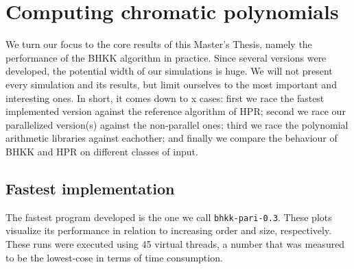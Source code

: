 \documentclass{cslthse-msc}
\newcommand{\code}{\texttt}
\begin{document}
\section{Computing chromatic polynomials}
We turn our focus to the core results of this Master's Thesis, namely the performance of the BHKK algorithm in practice. Since several versions were developed, the potential width of our simulations is huge. We will not present every simulation and its results, but limit ourselves to the most important and interesting ones. In short, it comes down to x cases: first we race the fastest implemented version against the reference algorithm of HPR; second we race our parallelized version(s) against the non-parallel ones; third we race the polynomial arithmetic libraries against eachother; and finally we compare the behaviour of BHKK and HPR on different classes of input.

\subsection{Fastest implementation}\label{fastest}
The fastest program developed is the one we call \code{bhkk-pari-0.3}. These plots visualize its performance in relation to increasing order and size, respectively. These runs were executed using 45 virtual threads, a number that was measured to be the lowest-cose in terms of time consumption.
\end{document}
